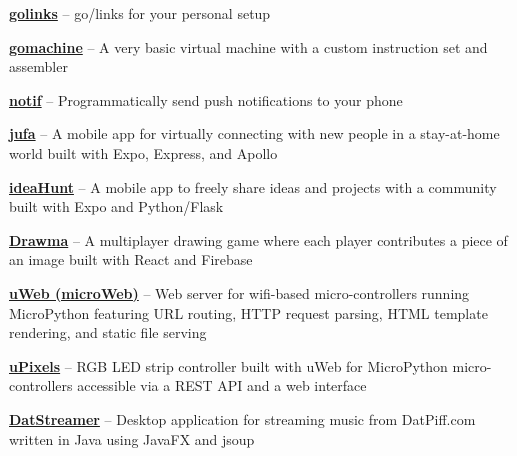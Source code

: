 

\textbf{\href{https://github.com/petabite/golinks}{golinks}} -- go/links for your personal setup

\smdivider

\textbf{\href{https://github.com/petabite/gomachine}{gomachine}} -- A very basic virtual machine with a custom instruction set and assembler

\smdivider

\textbf{\href{https://github.com/petabite/notif}{notif}} -- Programmatically send push notifications to your phone

\smdivider

\textbf{\href{https://github.com/youngppl/connect}{jufa}} -- A mobile app for virtually connecting with new people in a stay-at-home world built with Expo, Express, and Apollo

\smdivider

\textbf{\href{https://github.com/drizzleco/ideahunt}{ideaHunt}} -- A mobile app to freely share ideas and projects with a community built with Expo and Python/Flask

\smdivider

\textbf{\href{https://github.com/drizzleco/PuzzlePieces}{Drawma}} -- A multiplayer drawing game where each player contributes a piece of an image built with React and Firebase

\smdivider

\textbf{\href{https://github.com/petabite/uWeb}{uWeb (microWeb)}} -- Web server for wifi-based micro-controllers running MicroPython featuring URL routing, HTTP request parsing, HTML template rendering, and static file serving

\smdivider

\textbf{\href{https://github.com/petabite/uPixels}{uPixels}} -- RGB LED strip controller built with uWeb for
MicroPython micro-controllers accessible via a REST API and a web interface

\smdivider

\textbf{\href{https://github.com/petabite/DatStreamer}{DatStreamer}} -- Desktop application for streaming music from DatPiff.com written in Java using JavaFX and jsoup

\smdivider



